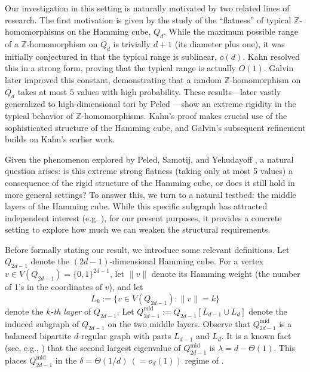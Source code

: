 \documentclass{amsart}
\theoremstyle{definition}
\newcommand{\md}{\mathrm{mid}}
\newcommand{\0}[0]{\emptyset}
\begin{document}
Our investigation in this setting is naturally motivated by two related lines of research. The first motivation is given by the study of the ``flatness'' of typical $\mathbb{Z}$-homomorphisms on the Hamming cube, $Q_d$. While the maximum possible range of a $\mathbb{Z}$-homomorphism on $Q_d$ is trivially $d+1$ (its diameter plus one), it was initially conjectured in \cite{benjamini2000random} that the typical range is sublinear, $o(d)$. Kahn \cite{kahn2001range} resolved this in a strong form, proving that the typical range is actually $O(1)$. Galvin \cite{galvin2003homomorphisms} later improved this constant, demonstrating that a random $\mathbb{Z}$-homomorphism on $Q_d$ takes at most $5$ values with high probability. These results---later vastly generalized to high-dimensional tori by Peled \cite{peled2017high}---show an extreme rigidity in the typical behavior of $\mathbb{Z}$-homomorphisms. Kahn's proof makes crucial use of the sophisticated structure of the Hamming cube, and Galvin's subsequent refinement builds on Kahn's earlier work.

Given the phenomenon explored by Peled, Samotij, and Yehudayoff \cite{peled2013lipschitz}, a natural question arises: is this extreme strong flatness (taking only at most 5 values) a consequence of the rigid structure of the Hamming cube, or does it still hold in more general settings? To answer this, we turn to a natural testbed: the middle layers of the Hamming cube. While this specific subgraph has attracted independent interest (e.g. \cite{balogh2025maximal,balogh2021independent,  duffus2013maximal, ilinca2013counting, li2023number}), for our present purposes, it provides a concrete setting to explore how much we can weaken the structural requirements.

Before formally stating our result, we introduce some relevant definitions. Let $Q_{2d-1}$ denote the $(2d-1)$-dimensional Hamming cube. For a vertex $v \in V(Q_{2d-1}) = \{0,1\}^{2d-1}$, let $\|v\|$ denote its Hamming weight (the number of 1's in the coordinates of $v$), and let
\[
    L_{k} := \{v\in V(Q_{2d-1}):\|v\|=k\}
\]
denote the \textit{$k$-th layer} of $Q_{2d-1}$. Let $Q_{2d-1}^{\md} := Q_{2d-1}[L_{d-1}\cup L_d]$ denote the induced subgraph of $Q_{2d-1}$ on the two middle layers. Observe that $Q_{2d-1}^{\md}$ is a balanced bipartite $d$-regular graph with parts $L_{d-1}$ and $L_d$. %
It is a known fact (see, e.g., \cite[Chapter 2]{stanley2013algebraic}) that the second largest eigenvalue of $Q_{2d-1}^{\md}$ is $\lambda = d - \Theta(1)$. This places $Q_{2d-1}^{\md}$ in the $\delta = \Theta(1/d) ~(= o_d(1))$ regime of .
\end{document}
